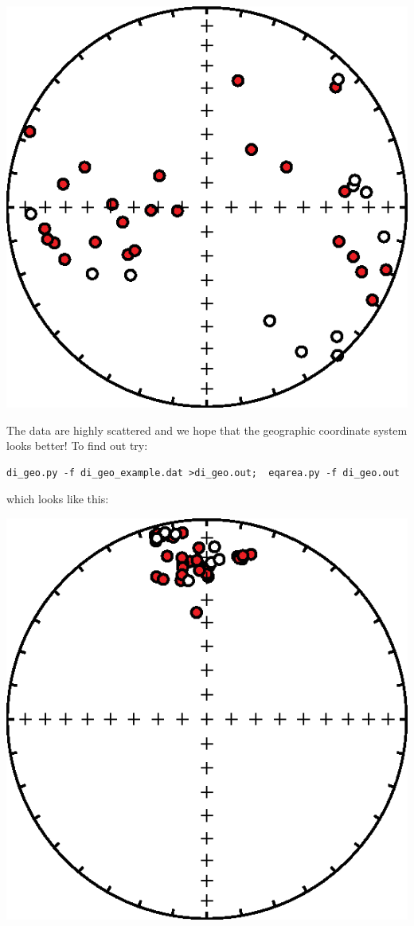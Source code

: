 \documentclass[11pt]{book}
\begin{document}
{{  \includegraphics[width=12 cm]{EPSfiles/di_geo_spc_eq.eps}



The data are highly scattered and we hope that the geographic coordinate system looks better!  To find out try:
\begin{verbatim}
di_geo.py -f di_geo_example.dat >di_geo.out;  eqarea.py -f di_geo.out

\end{verbatim}

\noindent which looks like this:

  \includegraphics[width=12 cm]{EPSfiles/di_geo_geo_eq.eps}

}}
\end{document}
